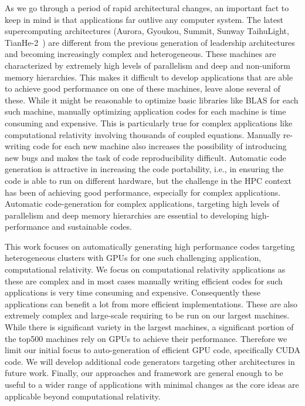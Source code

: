 As we go through a period of rapid architectural changes, an important fact to keep in mind is that applications far outlive any computer system. The latest %
supercomputing architectures (Aurora, Gyoukou, Summit, Sunway TaihuLight, TianHe-2~\cite{aurora,summit,gyoukou,top500}) are different from the previous generation of leadership architectures and becoming increasingly complex and heterogeneous. These machines are characterized by extremely high levels of parallelism and deep and non-uniform memory hierarchies. This makes it difficult to develop applications that are able to achieve good performance on one of these machines, leave alone several of these. While it might be reasonable to optimize basic libraries like BLAS for each such machine, manually optimizing application codes for each machine is time consuming and expensive. This is particularly true for complex applications like computational relativity involving thousands of coupled equations. Manually re-writing code for each new machine also increases the possibility of introducing new bugs and makes the task of code reproducibility difficult. Automatic code generation is attractive in increasing the code portability, i.e., in ensuring the code is able to run on different hardware, but the challenge in the HPC context has been of achieving good performance, especially for complex applications. Automatic code-generation for complex applications, targeting high levels of parallelism and deep memory hierarchies are essential to developing high-performance and sustainable codes. %

This work focuses on automatically generating high performance codes targeting heterogeneous clusters with GPUs for one such challenging application, computational relativity. We focus on computational relativity applications as these are complex and in most cases manually writing efficient codes for such applications is very time consuming and expensive. Consequently these applications can benefit a lot from more efficient implementations. These are also extremely complex and large-scale requiring to be run on our largest machines. While there is significant variety in the largest machines, a significant portion of the top500 \cite{top500} machines rely on GPUs to achieve their performance. Therefore we limit our initial focus to auto-generation of efficient GPU code, specifically CUDA code. We will develop additional code generators targeting other architectures in future work. Finally, our approaches and framework are general enough to be useful to a wider range of applications with minimal changes as the core ideas are applicable beyond computational relativity.

